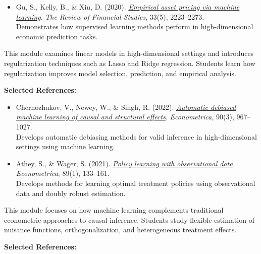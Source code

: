 \documentclass[11pt]{article}
\begin{document}
\begin{description}[leftmargin=0cm, labelindent=0cm, itemsep=1em]
\begin{itemize}[leftmargin=1.5em]
\item Gu, S., Kelly, B., \& Xiu, D. (2020).
\href{https://doi.org/10.1093/rfs/hhaa009}{\textit{Empirical asset pricing via machine learning}}.
\textit{The Review of Financial Studies}, 33(5), 2223--2273. \\
Demonstrates how supervised learning methods perform in high-dimensional economic prediction tasks.
\end{itemize}


\item[\textbf{Module 3: Linear Models and Regularization}]
This module examines linear models in high-dimensional settings and introduces regularization techniques such as Lasso and Ridge regression. Students learn how regularization improves model selection, prediction, and empirical analysis.

\vspace{0.3em}
\textbf{Selected References:}
\begin{itemize}[leftmargin=1.5em]
\item Chernozhukov, V., Newey, W., \& Singh, R. (2022).
\href{https://doi.org/10.3982/ECTA18515}{\textit{Automatic debiased machine learning of causal and structural effects}}.
\textit{Econometrica}, 90(3), 967--1027. \\
Develops automatic debiasing methods for valid inference in high-dimensional settings using machine learning.

\item Athey, S., \& Wager, S. (2021).
\href{https://doi.org/10.3982/ECTA15732}{\textit{Policy learning with observational data}}.
\textit{Econometrica}, 89(1), 133--161. \\
Develops methods for learning optimal treatment policies using observational data and doubly robust estimation.
\end{itemize}


\item[\textbf{Module 4: Machine Learning for Causal Inference}]
This module focuses on how machine learning complements traditional econometric approaches to causal inference. Students study flexible estimation of nuisance functions, orthogonalization, and heterogeneous treatment effects.

\vspace{0.3em}
\textbf{Selected References:}
\begin{itemize}[leftmargin=1.5em]


\end{itemize}
\end{description}
\end{document}
